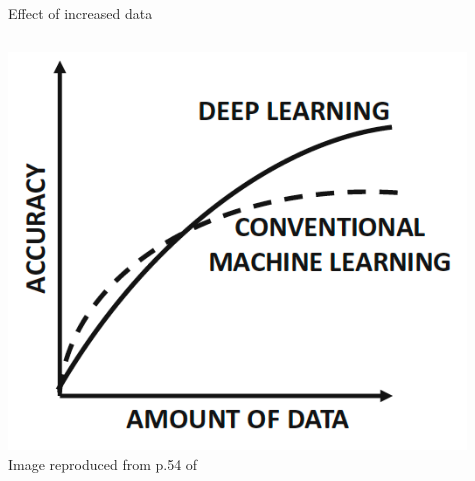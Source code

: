 \begin{frame}[t]{Effect of increased data}

    \begin{columns}
        \begin{column}{0.50\textwidth}
         \begin{center}
          \includegraphics[width=0.95\textwidth]{./images/dl_intro/accuracy_vs_amount_of_data_1.png}\\
          {\scriptsize \color{col:attribution} 
          Image reproduced from p.54 of \cite{Aggarwal:2018SpringerDL}}\\
         \end{center}
        \end{column}
        \begin{column}{0.50\textwidth}
        \end{column}
    \end{columns}


\end{frame}

%
%
%

